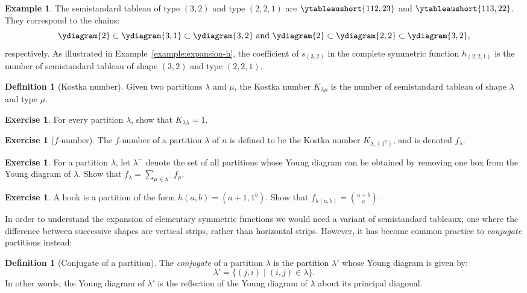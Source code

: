 \documentclass[11pt]{amsart}
\theoremstyle{definition}
\newtheorem{definition}[theorem]{Definition}
\theoremstyle{example}
\newtheorem{example}[theorem]{Example}
\newtheorem{exercise}[theorem]{Exercise}
\begin{document}
\begin{example}
  The semistandard tableau of type $(3,2)$ and type $(2,2,1)$ are $\ytableaushort{112,23}$ and $\ytableaushort{113,22}$.
  They correspond to the chains:
  \begin{displaymath}
    \ydiagram{2}\subset \ydiagram{3,1}\subset \ydiagram{3,2} \text{ and } \ydiagram{2}\subset \ydiagram{2,2}\subset \ydiagram{3,2},
  \end{displaymath}
  respectively.
  As illustrated in Example~\ref{example:expansion-h}, the coefficient of $s_{(3,2)}$ in the complete symmetric function $h_{(2,2,1)}$ is the number of semistandard tableau of shape $(3,2)$ and type $(2,2,1)$.
\end{example}
\begin{definition}
  [Kostka number]
  Given two partitions $\lambda$ and $\mu$, the Kostka number $K_{\lambda\mu}$ is the number of semistandard tableau of shape $\lambda$ and type $\mu$.
\end{definition}
\begin{exercise}
  \label{exercise:unit-kostka}
  For every partition $\lambda$, show that $K_{\lambda\lambda}=1$.
\end{exercise}
\begin{exercise}
  [$f$-number]
  The $f$-number of a partition $\lambda$ of $n$ is defined to be the Kostka number $K_{\lambda,(1^n)}$, and is denoted $f_\lambda$.
\end{exercise}
\begin{exercise}
  For a partition $\lambda$, let $\lambda^-$ denote the set of all partitions whose Young diagram can be obtained by removing one box from the Young diagram of $\lambda$.
  Show that $f_\lambda = \sum_{\mu\in \lambda^-} f_\mu$.
\end{exercise}
\begin{exercise}
  A hook is a partition of the form $h(a,b)=(a+1,1^b)$.
  Show that $f_{h(a,b)}=\binom{a+b}a$.
\end{exercise}
In order to understand the expansion of elementary symmetric functions we would need a variant of semistandard tableaux, one where the difference between successive shapes are vertical strips, rather than horizontal strips.
However, it has become common practice to \emph{conjugate} partitions instead:
\begin{definition}
  [Conjugate of a partition]
  The \emph{conjugate} of a partition $\lambda$ is the partition $\lambda'$ whose Young diagram is given by:
  \begin{displaymath}
    \lambda' = \{(j,i)\mid (i, j)\in \lambda\}.
  \end{displaymath}
  In other words, the Young diagram of $\lambda'$ is the reflection of the Young diagram of $\lambda$ about its principal diagonal.
\end{definition}
\end{document}

